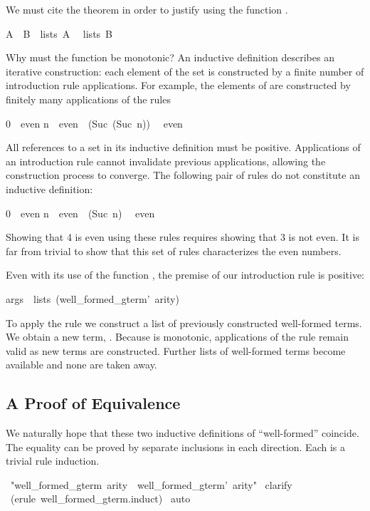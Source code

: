 We must cite the theorem  in order to justify 
using the function . 
\begin{isabelle}
A\ \isasymsubseteq\ B\ \isasymLongrightarrow \ lists\ A\ \isasymsubseteq
\ lists\ B
\end{isabelle}
%
Why must the function be monotonic?  An inductive definition describes
an iterative construction: each element of the set is constructed by a
finite number of introduction rule applications.  For example, the
elements of  are constructed by finitely many applications of
the rules 
\begin{isabelle}
0\ \isasymin \ even\isanewline
n\ \isasymin \ even\ \isasymLongrightarrow \ (Suc\ (Suc\ n))\ \isasymin
\ even
\end{isabelle}
All references to a set in its
inductive definition must be positive.  Applications of an
introduction rule cannot invalidate previous applications, allowing the
construction process to converge.
The following pair of rules do not constitute an inductive definition:
\begin{isabelle}
0\ \isasymin \ even\isanewline
n\ \isasymnotin \ even\ \isasymLongrightarrow \ (Suc\ n)\ \isasymin
\ even
\end{isabelle}
%
Showing that 4 is even using these rules requires showing that 3 is not
even.  It is far from trivial to show that this set of rules
characterizes the even numbers.  

Even with its use of the function , the premise of our
introduction rule is positive:
\begin{isabelle}
args\ \isasymin \ lists\ (well_formed_gterm'\ arity)
\end{isabelle}
To apply the rule we construct a list  of previously
constructed well-formed terms.  We obtain a
new term, .  Because  is monotonic,
applications of the rule remain valid as new terms are constructed.
Further lists of well-formed
terms become available and none are taken away.


\subsection{A Proof of Equivalence}

We naturally hope that these two inductive definitions of ``well-formed'' 
coincide.  The equality can be proved by separate inclusions in 
each direction.  Each is a trivial rule induction. 
\begin{isabelle}
\ "well_formed_gterm\ arity\ \isasymsubseteq \ well_formed_gterm'\ arity"\isanewline
{}\ clarify\isanewline
{}\ (erule\ well_formed_gterm.induct)\isanewline
{}\ auto\isanewline
{}
\end{isabelle}

